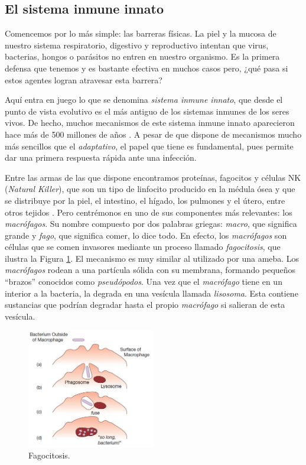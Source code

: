 \subsection{El sistema inmune innato}

Comencemos por lo más simple: las barreras físicas. La piel y la mucosa de nuestro sistema respiratorio, digestivo y reproductivo intentan que virus, bacterias, hongos o parásitos no entren en nuestro organismo. Es la primera defensa que tenemos y es bastante efectiva en muchos casos pero, ¿qué pasa si estos agentes logran atravesar esta barrera?

Aquí entra en juego lo que se denomina \textit{sistema inmune innato}, que desde el punto de vista evolutivo es el más antiguo de los sistemas inmunes de los seres vivos. De hecho, muchos mecanismos de este sistema inmune innato aparecieron hace más de 500 millones de años \citep{theHowItWorks}. A pesar de que dispone de mecanismos mucho más sencillos que el \textit{adaptativo}, el papel que tiene es fundamental, pues permite dar una primera respuesta rápida ante una infección. 

Entre las armas de las que dispone encontramos proteínas, fagocitos y células NK (\textit{Natural Killer}), que son un tipo de linfocito producido en la médula ósea y que se distribuye por la piel, el intestino, el hígado, los pulmones y el útero, entre otros tejidos \citep{celulasNK}. Pero centrémonos en uno de sus componentes más relevantes: los \textit{macrófagos}. Su nombre compuesto por dos palabras griegas: \textit{macro}, que significa grande y \textit{fago}, que significa comer, lo dice todo. En efecto, los \textit{macrófagos} son células que se comen invasores mediante un proceso llamado \textit{fagocitosis}, que ilustra la Figura \ref{fig:macrofago}. El mecanismo es muy similar al utilizado por una ameba. Los \textit{macrófagos} rodean a una partícula sólida con su membrana, formando pequeños ``brazos'' conocidos como \textit{pseudópodos}. Una vez que el \textit{macrófago} tiene en un interior a la bacteria, la degrada en una vesícula llamada \textit{lisosoma}. Esta contiene sustancias que podrían degradar hasta el propio \textit{macrófago} si salieran de esta vesícula. 


\begin{figure}[t]
	\centering
	\includegraphics[width=0.5\textwidth]{1_macrofago}
	\caption{Fagocitosis.}
	\label{fig:macrofago}
\end{figure}


